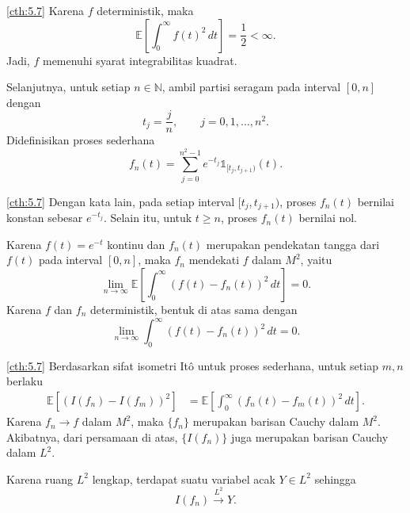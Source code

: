 \documentclass[aspectratio=169,11pt]{beamer}
\theoremstyle{definition}
\newcommand{\myref}[1]{\hyperref[#1]{\nameCref{#1} \ref*{#1}}}
\begin{document}
\begin{frame}{\insertsection}{\insertsubsection}
  \begin{exampleblock}{\myref{cth:5.7}}
    Karena $f$ deterministik, maka
    \[
      \mathbb{E}\left[
        \int_0^\infty f(t)^2\,dt
        \right]
      =
      \frac{1}{2}
      <
      \infty.
    \]
    Jadi, $f$ memenuhi syarat integrabilitas kuadrat.

    Selanjutnya, untuk setiap $n\in\mathbb{N}$, ambil partisi seragam pada interval
    $[0,n]$ dengan
    \[
      t_j=\frac{j}{n},
      \qquad
      j=0,1,\ldots,n^2.
    \]
    Didefinisikan proses sederhana
    \[
      f_n(t)
      =
      \sum_{j=0}^{n^2-1}
      e^{-t_j}\mathds{1}_{[t_j,t_{j+1})}(t).
    \]
  \end{exampleblock}
\end{frame}

\begin{frame}{\insertsection}{\insertsubsection}
  \begin{exampleblock}{\myref{cth:5.7}}
    Dengan kata lain, pada setiap interval $[t_j,t_{j+1})$, proses $f_n(t)$ bernilai
    konstan sebesar $e^{-t_j}$. Selain itu, untuk $t\geq n$, proses $f_n(t)$ bernilai
    nol.

    Karena $f(t)=e^{-t}$ kontinu dan $f_n(t)$ merupakan pendekatan tangga dari $f(t)$
    pada interval $[0,n]$, maka $f_n$ mendekati $f$ dalam $M^2$, yaitu
    \[
      \lim_{n\to\infty}
      \mathbb{E}\left[
        \int_0^\infty (f(t)-f_n(t))^2\,dt
        \right]
      =
      0.
    \]
    Karena $f$ dan $f_n$ deterministik, bentuk di atas sama dengan
    \[
      \lim_{n\to\infty}
      \int_0^\infty (f(t)-f_n(t))^2\,dt
      =
      0.
    \]
  \end{exampleblock}
\end{frame}

\begin{frame}{\insertsection}{\insertsubsection}
  \begin{exampleblock}{\myref{cth:5.7}}
    Berdasarkan sifat isometri Itô untuk proses sederhana, untuk setiap $m,n$
    berlaku
    \[
      \begin{aligned}
        \mathbb{E}\left[
                    \left(I(f_n)-I(f_m)\right)^2
                    \right]
         & =
        \mathbb{E}\left[
                    \int_0^\infty (f_n(t)-f_m(t))^2\,dt
                    \right].
      \end{aligned}
    \]
    Karena $f_n\to f$ dalam $M^2$, maka $\{f_n\}$ merupakan barisan Cauchy dalam
    $M^2$. Akibatnya, dari persamaan di atas, $\{I(f_n)\}$ juga merupakan barisan
    Cauchy dalam $L^2$.

    Karena ruang $L^2$ lengkap, terdapat suatu variabel acak $Y\in L^2$ sehingga
    \[
      I(f_n)\xrightarrow{L^2}Y.
    \]
  \end{exampleblock}
\end{frame}
\end{document}
